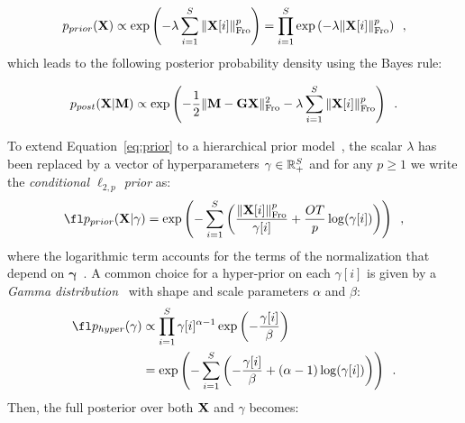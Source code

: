 \begin{equation} \label{eq:prior}
p_{prior}(\mathbf{X}) \propto \exp \left( - \lambda \sum_{i=1}^S \|{\mathbf{X}[i]}\|_{\rm Fro}^p \right)
= \prod_{i=1}^S \exp \left( - \lambda \|{\mathbf{X}[i]}\|_{\rm Fro}^p \right) \enspace,
\end{equation}
which leads to the following posterior probability density using the Bayes rule:

\begin{equation} \label{eq:post}
p_{post}(\mathbf{X}|\mathbf{M}) \propto \exp \left( - \frac{1}{2} \|{\mathbf{M} - \mathbf{G} \mathbf{X}}\|_{\rm Fro}^2 - \lambda \sum_{i=1}^S \|{\mathbf{X}[i]}\|_{\rm Fro}^p \right) \enspace.
\end{equation}

To extend Equation~\eqref{eq:prior} to a hierarchical prior model~\cite{mackay2003information}, the scalar $\lambda$ has been replaced by a vector of hyperparameters $\mathbf{\gamma} \in \mathbb{R}^{S}_+$ and for any $p \geq 1$ we write the \emph{conditional $\ell_{2,p}$ prior} as:
\begin{equation} \label{eq:condprior}
\fl \hiprior
= \exp \left( - \sum_{i=1}^S \left( \frac{\fronorm{\bfX[i]}^p}{\mathbf{\gamma}[i]} + \frac{O T}{p} \log(\mathbf{\gamma}[i])\right)\right) \enspace,
\end{equation}
where the logarithmic term accounts for the terms of the normalization that depend on $\mathbf{\gamma}$~\cite{Lu14}. A common choice for a hyper-prior on each $\gamma[i]$ is given by a \emph{Gamma distribution}~\cite{mackay2003information,KaSo05,CaHaPuSo09,Lucka-etal:2012} with shape and scale parameters $\alpha$ and $\beta$:
\begin{align} \label{eq:hyper}
\fl \hyper & \propto \prod_{i=1}^S \mathbf{\gamma}[i]^{\alpha - 1} \exp \left(- \frac{\mathbf{\gamma}[i]}{\beta} \right) \\
& = \exp \left( - \sum_{i=1}^S \left( - \frac{\mathbf{\gamma}[i]}{\beta} + (\alpha - 1) \log(\mathbf{\gamma}[i]) \right) \right) \enspace.
\end{align}
Then, the full posterior over both $\mathbf{X}$ and $\gamma$ becomes:

